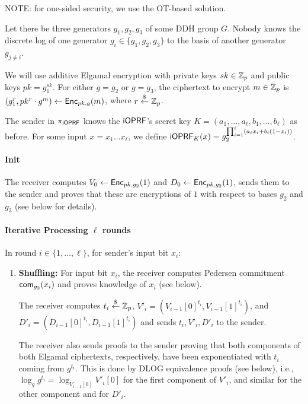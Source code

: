 \documentclass{article}
\begin{document}
NOTE: for one-sided security, we use the OT-based solution.

Let there be three generators $g_1,g_2,g_3$ of some DDH group $G$. Nobody
knows the discrete log of one generator $g_i\in\{g_1,g_2,g_3\}$ to
the basis of another generator $g_{j\neq{}i}$.

We will use additive Elgamal encryption with private keys $sk\in\mathbb{Z}_p$
and public keys $pk=g_1^{sk}$. For either $g=g_2$ or $g=g_3$, the
ciphertext to encrypt $m\in\mathbb{Z}_p$ is
$(g_1^r,pk^r\cdot{}g^m)\leftarrow{\mathsf{Enc}}_{pk,g}(m)$, where $r\stackrel{\$}{\leftarrow}\mathbb{Z}_p$.

The sender in ${\pi_{\mathsf{i}\mathsf{OPRF}}}$ knows the $\mathsf{i}\mathsf{OPRF}$'s secret key
$K=(a_1,\ldots,a_\ell,b_1,\ldots,b_\ell)$ as before. For some input
$x=x_1\ldots{}x_\ell$, we define
$\mathsf{i}\mathsf{OPRF}_K(x)=g_2^{\prod_{i=1}^{\ell}(a_ix_i+b_i(1-x_i))}$.

\paragraph{Init}
The receiver computes $V_0 \leftarrow{\mathsf{Enc}}_{pk,g_2}(1)$ and
$D_0\leftarrow{\mathsf{Enc}}_{pk,g_2}(1)$, sends them to the sender and proves
that these are encryptions of $1$ with respect to bases $g_2$ and
$g_3$ (see below for details).

\paragraph{Iterative Processing $\ell$ rounds}
In round $i\in\{1,\ldots,\ell\}$, for sender's input bit $x_i$:
\begin{enumerate}
\item {\bf Shuffling:} For input bit $x_i$, the receiver computes
  Pedersen commitment $\mathsf{com}_{g_2}(x_i)$ and proves knowledge of $x_i$
  (see below).


  

  The receiver computes $t_i\stackrel{\$}{\leftarrow}\mathbb{Z}_p$,
  $V'_i=(V_{i-1}[0]^{t_i},V_{i-1}[1]^{t_i})$, and
  $D'_i=(D_{i-1}[0]^{t_i},D_{i-1}[1]^{t_i})$ and sends $t_i,V'_i,D'_i$
  to the sender.

  The receiver also sends proofs to the sender proving that both
  components of both Elgamal ciphertexts, respectively, have been
  exponentiated with $t_i$ coming from $g^{t_i}$. This is done by DLOG
  equivalence proofs (see below), i.e.,
  $\log_g{g^{t_i}}=\log_{V_{i-1}[0]}{V'_i[0]}$ for the first component
  of $V'_i$, and similar for the other component and for $D'_i$.

  
\end{enumerate}
\end{document}
